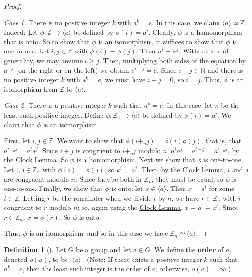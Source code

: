\documentclass[10pt,openany,oneside]{book}
\newcommand{\terminology}[1]{\textbf{#1}}
\theoremstyle{plain}
\theoremstyle{definition}
\newtheorem{definition}[theorem]{Definition}
\theoremstyle{definition}
\theoremstyle{definition}
\theoremstyle{definition}
\numberwithin{equation}{section}
\def\Z{\mathbb{Z}}
\def\N{\mathbb{N}}
\begin{document}
\begin{proof}\hypertarget{proof-21}{}
\emph{Case 1.} There is no positive integer \(k\) with \(a^k=e\). In this case, we claim \(\langle a\rangle \simeq \Z\). Indeed: Let \(\phi:\Z\to \langle a\rangle\) be defined by \(\phi(i)=a^i\). Clearly, \(\phi\) is a homomorphism that is onto. So to show that \(\phi\) is an isomorphism, it suffices to show that \(\phi\) is one-to-one. Let \(i,j\in \Z\) with \(\phi(i)=\phi(j)\). Then \(a^i=a^j\). Without loss of generality, we may assume \(i\geq j\). Then, multiplying both sides of the equation by \(a^{-j}\) (on the right or on the left) we obtain \(a^{i-j}=e\). Since \(i-j\in \N\) and there is no positive integer \(k\) with \(a^k=e\), we must have \(i-j=0\), so \(i=j\). Thus, \(\phi\) is an isomorphism from \(\Z\) to \(\langle a\rangle\).%
\par
\emph{Case 2.}  There is a positive integer \(k\) such that \(a^k=e\). In this case, let \(n\) be the least such positive integer. Define \(\phi:\Z_n\to \langle a\rangle\) be defined by \(\phi(i)=a^i\). We claim that \(\phi\) is an isomorphism.%
\par
First, let \(i,j\in \Z\). We want to show that \(\phi(i+_nj)=\phi(i)\phi(j)\), that is, that \(a^{i+_nj}=a^ia^j\). Since \(i+j\) is congruent to \(i+_nj\) modulo \(n\), \(a^ia^j=a^{i+j}=a^{i+_nj}\), by the \hyperref[clock]{Clock Lemma}. So \(\phi\) is a homomorphism. Next we show that \(\phi\) is one-to-one. Let \(i,j\in \Z_n\) with \(\phi(i)=\phi(j)\), so \(a^i=a^j\). Then, by the Clock Lemma, \(i\) and \(j\) are congruent modulo \(n\). Since they're both in \(\Z_n\), they must be equal, so \(\phi\) is one-to-one. Finally, we show that \(\phi\) is onto. let \(x\in \langle a\rangle\). Then \(x=a^i\) for some \(i\in \Z\). Letting \(r\) be the remainder when we divide \(i\) by \(n\), we have \(r\in \Z_n\) with \(i\) congruent to \(r\) modulo \(n\); so, again using the \hyperref[clock]{Clock Lemma}, \(x=a^i=a^r\). Since \(r\in \Z_n\), \(x=\phi(r)\). So \(\phi\) is onto.%
\par
Thus, \(\phi\) is an isomorphism, and so in this case we have \(\Z_n \simeq \langle a \rangle\).%
\end{proof}
\begin{definition}[{}]\label{definition-39}
\label{notation-55}
Let \(G\) be a group and let \(a\in G\). We define the \terminology{order} of \(a\), denoted \(o(a)\), to be \(|\langle a\rangle |\). (Note: If there exists a positive integer \(k\) such that \(a^k=e\), then the least such integer is the order of \(a\); otherwise, \(o(a)=\infty\).)%
\end{definition}
\end{document}
